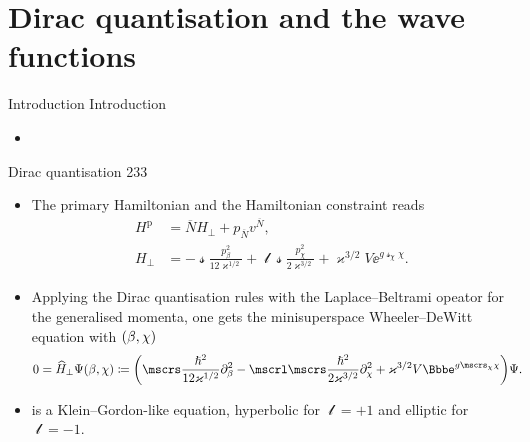 \documentclass[9pt]{beamer}
\begin{document}
\section{Dirac quantisation and the wave functions}

\begin{frame}%
{Introduction}%
{Introduction}
\begin{itemize}
	\item
\end{itemize}
\end{frame}

\begin{frame}%
{Dirac quantisation}%
{233}
\begin{itemize}
\item
The primary Hamiltonian and the Hamiltonian constraint reads
\begin{align}
H^\text{p} &= \overline{N}H_\perp + p_{\overline{N}} v^{\overline{N}},
\\
H_\perp &= -\mscrs\frac{p_\beta^2}{12\varkappa^{1/2}}
+\mscrl\mscrs\frac{p_\chi^2}{2\varkappa^{3/2}}
+\varkappa^{3/2}V\ee^{g\mscrs_\chi\chi}.
\end{align}
\item
Applying the Dirac quantisation rules with the Laplace--Beltrami opeator for
the generalised momenta, one gets the minisuperspace Wheeler--DeWitt
equation with ${\left(\beta,\chi\right)}$
\begin{align}
0 &= \widehat{H}_\perp \rfun{\Psi}{\beta,\chi} \coloneqq
\rbr{\mscrs\frac{\hslash^2}{12\varkappa^{1/2}}\partial_{\beta}^2
-\mscrl\mscrs\frac{\hslash^2}{2\varkappa^{3/2}}\partial_{\chi}^2
+\varkappa^{3/2}V\ee^{g\mscrs_\chi\chi}}\Psi.
\label{eq:WDW-10}
\end{align}
\item
{} is a Klein--Gordon-like equation, hyperbolic for
$\mscrl = +1$ and \alert{elliptic} for $\mscrl = -1$.
\end{itemize}
\end{frame}
\end{document}
